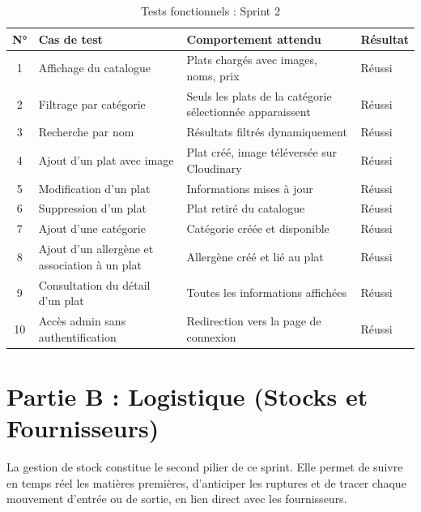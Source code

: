 \begin{table}[H]
    \centering
    \caption{Tests fonctionnels : Sprint 2}
    \label{tab:tests_sprint2}
    \renewcommand{\arraystretch}{1.3}
    \begin{tabular}{|c|p{3cm}|p{3.5cm}|p{2.5cm}|}
        \hline
        \textbf{N°} & \textbf{Cas de test} & \textbf{Comportement attendu} & \textbf{Résultat} \\
        \hline
        1 & Affichage du catalogue & Plats chargés avec images, noms, prix & Réussi \\
        \hline
        2 & Filtrage par catégorie & Seuls les plats de la catégorie sélectionnée apparaissent & Réussi \\
        \hline
        3 & Recherche par nom & Résultats filtrés dynamiquement & Réussi \\
        \hline
        4 & Ajout d'un plat avec image & Plat créé, image téléversée sur Cloudinary & Réussi \\
        \hline
        5 & Modification d'un plat & Informations mises à jour & Réussi \\
        \hline
        6 & Suppression d'un plat & Plat retiré du catalogue & Réussi \\
        \hline
        7 & Ajout d'une catégorie & Catégorie créée et disponible & Réussi \\
        \hline
        8 & Ajout d'un allergène et association à un plat & Allergène créé et lié au plat & Réussi \\
        \hline
        9 & Consultation du détail d'un plat & Toutes les informations affichées & Réussi \\
        \hline
        10 & Accès admin sans authentification & Redirection vers la page de connexion & Réussi \\
        \hline
    \end{tabular}
\end{table}

\section{Partie B : Logistique (Stocks et Fournisseurs)}

La gestion de stock constitue le second pilier de ce sprint. Elle permet de suivre en temps réel les matières premières, d'anticiper les ruptures et de tracer chaque mouvement d'entrée ou de sortie, en lien direct avec les fournisseurs.

